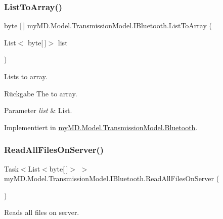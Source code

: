 \subsubsection{\texorpdfstring{List\+To\+Array()}{ListToArray()}}
{\footnotesize\ttfamily byte \mbox{[}$\,$\mbox{]} my\+M\+D.\+Model.\+Transmission\+Model.\+I\+Bluetooth.\+List\+To\+Array (\begin{DoxyParamCaption}\item[{List$<$ byte\mbox{[}$\,$\mbox{]}$>$}]{list }\end{DoxyParamCaption})}



Lists to array. 

\begin{DoxyReturn}{Rückgabe}
The to array.
\end{DoxyReturn}

\begin{DoxyParams}{Parameter}
{\em list} & List.\\
\hline
\end{DoxyParams}


Implementiert in \mbox{\hyperlink{classmy_m_d_1_1_model_1_1_transmission_model_1_1_bluetooth_a7a690e7dd2fae436c3ad119ddd023e70}{my\+M\+D.\+Model.\+Transmission\+Model.\+Bluetooth}}.

\mbox{\label{interfacemy_m_d_1_1_model_1_1_transmission_model_1_1_i_bluetooth_a1a929cee5eff377bd3a2c51fa802e597}} 
\subsubsection{\texorpdfstring{Read\+All\+Files\+On\+Server()}{ReadAllFilesOnServer()}}
{\footnotesize\ttfamily Task$<$List$<$byte\mbox{[}$\,$\mbox{]}$>$ $>$ my\+M\+D.\+Model.\+Transmission\+Model.\+I\+Bluetooth.\+Read\+All\+Files\+On\+Server (\begin{DoxyParamCaption}{ }\end{DoxyParamCaption})}



Reads all files on server. 

